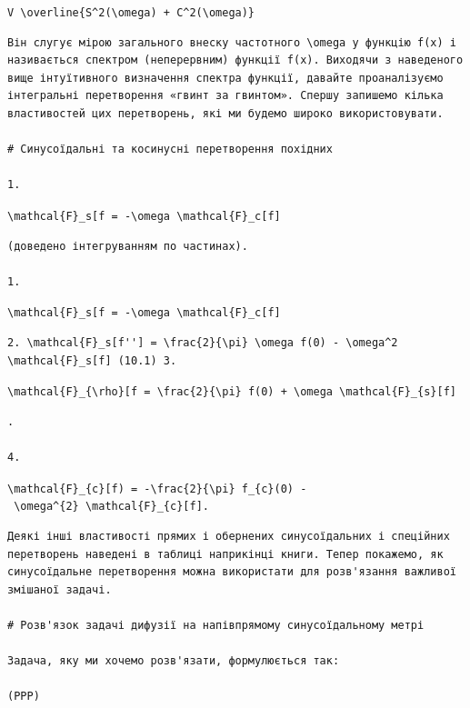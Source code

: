 \documentclass[
  ukrainian,
]{article}
\begin{document}
\texttt{V\ \textbackslash{}overline\{S\^{}2(\textbackslash{}omega)\ +\ C\^{}2(\textbackslash{}omega)\}}

\begin{verbatim}
Він слугує мірою загального внеску частотного \omega у функцію f(x) і називається спектром (неперервним) функції f(x). Виходячи з наведеного вище інтуїтивного визначення спектра функції, давайте проаналізуємо інтегральні перетворення «гвинт за гвинтом». Спершу запишемо кілька властивостей цих перетворень, які ми будемо широко використовувати.

# Синусоїдальні та косинусні перетворення похідних

1.
\end{verbatim}

\texttt{\textbackslash{}mathcal\{F\}\_s{[}f\textquotesingle{}{]}\ =\ -\textbackslash{}omega\ \textbackslash{}mathcal\{F\}\_c{[}f{]}}

\begin{verbatim}
(доведено інтегруванням по частинах).

1.
\end{verbatim}

\texttt{\textbackslash{}mathcal\{F\}\_s{[}f\textquotesingle{}{]}\ =\ -\textbackslash{}omega\ \textbackslash{}mathcal\{F\}\_c{[}f{]}}

\begin{verbatim}
2. \mathcal{F}_s[f''] = \frac{2}{\pi} \omega f(0) - \omega^2 \mathcal{F}_s[f] (10.1) 3.
\end{verbatim}

\texttt{\textbackslash{}mathcal\{F\}\_\{\textbackslash{}rho\}{[}f\textquotesingle{}{]}\ =\ \textbackslash{}frac\{2\}\{\textbackslash{}pi\}\ f(0)\ +\ \textbackslash{}omega\ \textbackslash{}mathcal\{F\}\_\{s\}{[}f{]}}

\begin{verbatim}
.

4.
\end{verbatim}

\texttt{\textbackslash{}mathcal\{F\}\_\{c\}{[}f\textquotesingle{}\textquotesingle{})\ =\ -\textbackslash{}frac\{2\}\{\textbackslash{}pi\}\ f\_\{c\}(0)\ -\ \textbackslash{}omega\^{}\{2\}\ \textbackslash{}mathcal\{F\}\_\{c\}{[}f{]}.}

\begin{verbatim}
Деякі інші властивості прямих і обернених синусоїдальних і спеційних перетворень наведені в таблиці наприкінці книги. Тепер покажемо, як синусоїдальне перетворення можна використати для розв'язання важливої змішаної задачі.

# Розв'язок задачі дифузії на напівпрямому синусоїдальному метрі

Задача, яку ми хочемо розв'язати, формулюється так:

(PPP)
\end{verbatim}
\end{document}
